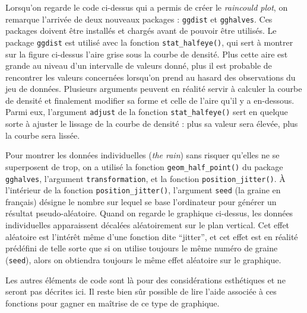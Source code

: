 \documentclass[
  french,
]{book}
\begin{document}
Lorsqu'on regarde le code ci-dessus qui a permis de créer le \emph{raincould plot}, on remarque l'arrivée de deux nouveaux packages : \texttt{ggdist} et \texttt{gghalves}. Ces packages doivent être installés et chargés avant de pouvoir être utilisés. Le package \texttt{ggdist} est utilisé avec la fonction \texttt{stat\_halfeye()}, qui sert à montrer sur la figure ci-dessus l'aire grise sous la courbe de densité. Plus cette aire est grande au niveau d'un intervalle de valeurs donné, plus il est probable de rencontrer les valeurs concernées lorsqu'on prend au hasard des observations du jeu de données. Plusieurs arguments peuvent en réalité servir à calculer la courbe de densité et finalement modifier sa forme et celle de l'aire qu'il y a en-dessous. Parmi eux, l'argument \texttt{adjust} de la fonction \texttt{stat\_halfeye()} sert en quelque sorte à ajuster le lissage de la courbe de densité : plus sa valeur sera élevée, plus la courbe sera lissée.

Pour montrer les données individuelles (\emph{the rain}) sans risquer qu'elles ne se superposent de trop, on a utilisé la fonction \texttt{geom\_half\_point()} du package \texttt{gghalves}, l'argument \texttt{transformation}, et la fonction \texttt{position\_jitter()}. À l'intérieur de la fonction \texttt{position\_jitter()}, l'argument \texttt{seed} (la graine en français) désigne le nombre sur lequel se base l'ordinateur pour générer un résultat pseudo-aléatoire. Quand on regarde le graphique ci-dessus, les données individuelles apparaissent décalées aléatoirement sur le plan vertical. Cet effet aléatoire est l'intérêt même d'une fonction dite ``jitter'', et cet effet est en réalité prédéfini de telle sorte que si on utilise toujours le même numéro de graine (\texttt{seed}), alors on obtiendra toujours le même effet aléatoire sur le graphique.

Les autres éléments de code sont là pour des considérations esthétiques et ne seront pas décrites ici. Il reste bien sûr possible de lire l'aide associée à ces fonctions pour gagner en maîtrise de ce type de graphique.
\end{document}
